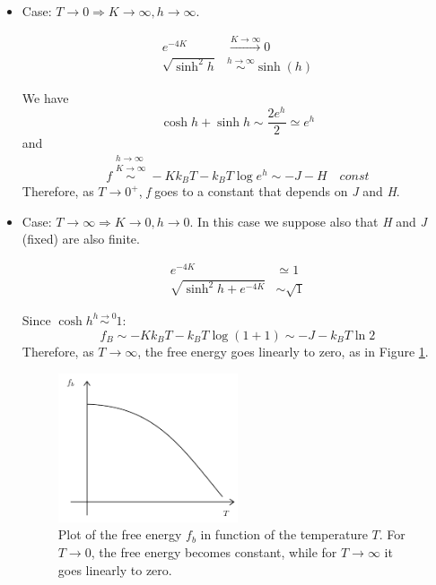 \documentclass[../main/main.tex]{subfiles}
\begin{document}
\begin{itemize}
\item Case: \( T \rightarrow 0  \Rightarrow K \rightarrow \infty , h \rightarrow \infty  \).
\begin{subequations*}
\begin{align*}
  e^{-4K} & \overset{K \rightarrow \infty }{\longrightarrow} 0  \\
  \sqrt{\sinh^2 h} & \overset{h \rightarrow \infty }{\sim } \sinh (h)
\end{align*}
\end{subequations*}
We have 
\begin{equation*}
\cosh h + \sinh h \sim \frac{2 e^{h} }{2} \simeq e^{h}
\end{equation*}
and
\begin{equation}
  f \overset{\substack{h \rightarrow \infty  \\ K \rightarrow \infty  } }{\sim } - K k_B T - k_B T \log{e^{h} } \sim -J -H \quad const
\end{equation}
Therefore, as \( T \rightarrow 0^+ \), \emph{f} goes to a constant that depends on \emph{J} and \emph{H}.

\item  Case: \( T \rightarrow \infty   \Rightarrow K \rightarrow 0 , h \rightarrow 0  \).
In this case we suppose also that \emph{H} and \emph{J} (fixed) are also finite.
\begin{subequations*}
\begin{align*}
  e^{-4K} & \simeq 1  \\
  \sqrt{\sinh^2 h + e^{-4K} } & \sim \sqrt{1}
\end{align*}
\end{subequations*}
Since \( \cosh h \overset{h \rightarrow 0}{\sim } 1  \):
\begin{equation}
  f_B \sim  -K k_B T - k_B T \log{(1+1)} \sim  -J -k_B T \ln{2}
\end{equation}
Therefore, as \( T \rightarrow \infty  \), the free energy goes linearly to zero, as in Figure \ref{fig:8_1}.
\begin{figure}[h!]
\centering
\includegraphics[width=0.5\textwidth]{../lessons/8_image/1.pdf}
\caption{\label{fig:8_1} Plot of the free energy \( f_b \) in function of the temperature \( T \). For \( T \rightarrow 0 \), the free energy becomes constant, while for \( T \rightarrow \infty  \) it goes linearly to zero.  }
\end{figure}
\end{itemize}
\end{document}
